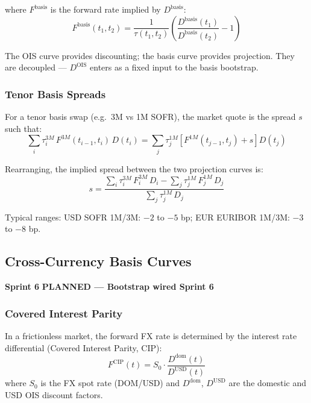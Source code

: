 \documentclass[11pt, a4paper]{article}
\newcommand{\sprintstatus}[3]{%
  \begin{tcolorbox}[sprintbox]
  \small
  \textbf{\color{navy}Sprint #1} \quad
  \textbf{\color{#2}#3}
  \end{tcolorbox}\vspace{4pt}
}
\begin{document}
where $F^{\mathrm{basis}}$ is the forward rate implied by $D^{\mathrm{basis}}$:
\begin{equation}
  F^{\mathrm{basis}}(t_1,t_2)
  = \frac{1}{\tau(t_1,t_2)}
    \left(\frac{D^{\mathrm{basis}}(t_1)}{D^{\mathrm{basis}}(t_2)} - 1\right)
\end{equation}

The OIS curve provides discounting; the basis curve provides projection.
They are decoupled — $D^{\mathrm{OIS}}$ enters as a fixed input to the
basis bootstrap.

\subsubsection{Tenor Basis Spreads}

For a tenor basis swap (e.g.\ 3M vs 1M SOFR), the market quote is the
spread $s$ such that:
\begin{equation}
  \sum_{i}\tau_i^{3M}\,F^{3M}(t_{i-1},t_i)\,D(t_i)
  =
  \sum_{j}\tau_j^{1M}\!\left[F^{1M}(t_{j-1},t_j) + s\right]\!D(t_j)
\end{equation}

Rearranging, the implied spread between the two projection curves is:
\begin{equation}
  s = \frac{\sum_i \tau_i^{3M}\,F^{3M}_i\,D_i
            - \sum_j \tau_j^{1M}\,F^{1M}_j\,D_j}
           {\sum_j \tau_j^{1M}\,D_j}
\end{equation}

Typical ranges: USD SOFR 1M/3M: $-2$ to $-5$ bp; EUR EURIBOR 1M/3M: $-3$ to $-8$ bp.

\subsection{Cross-Currency Basis Curves}

\sprintstatus{6}{amber!80!black}{PLANNED — Bootstrap wired Sprint 6}

\subsubsection{Covered Interest Parity}

In a frictionless market, the forward FX rate is determined by the interest
rate differential (Covered Interest Parity, CIP):
\begin{equation}
  F^{\mathrm{CIP}}(t) = S_0 \cdot \frac{D^{\mathrm{dom}}(t)}{D^{\mathrm{USD}}(t)}
\end{equation}
where $S_0$ is the FX spot rate (DOM/USD) and $D^{\mathrm{dom}}$, $D^{\mathrm{USD}}$
are the domestic and USD OIS discount factors.
\end{document}
